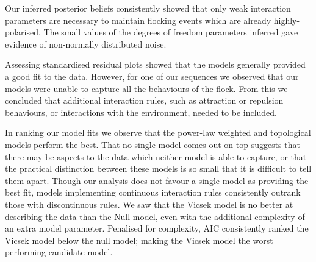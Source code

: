 Our inferred posterior beliefs consistently showed that only weak interaction
parameters are necessary to maintain flocking events which are already
highly-polarised. The small values of the degrees of freedom parameters
inferred gave evidence of non-normally distributed noise.

Assessing standardised residual plots showed that the models generally
provided a good fit to the data. However, for one of our sequences we
observed that our models were unable to capture all the behaviours of the
flock. From this we concluded that additional interaction rules, such as
attraction or repulsion behaviours, or interactions with the environment,
needed to be included.

In ranking our model fits we observe that the power-law weighted and
topological models perform the best. That no single model comes out on top
suggests that there may be aspects to the data which neither model is able to
capture, or that the practical distinction between these models is so small
that it is difficult to tell them apart. Though our analysis does not favour a
single model as providing the best fit, models implementing continuous
interaction rules consistently outrank those with discontinuous rules. We saw
that the Vicsek model is no better at describing the data than the Null model,
even with the additional complexity of an extra model parameter. Penalised for
complexity, AIC consistently ranked the Vicsek model below the null model;
making the Vicsek model the worst performing candidate model.

